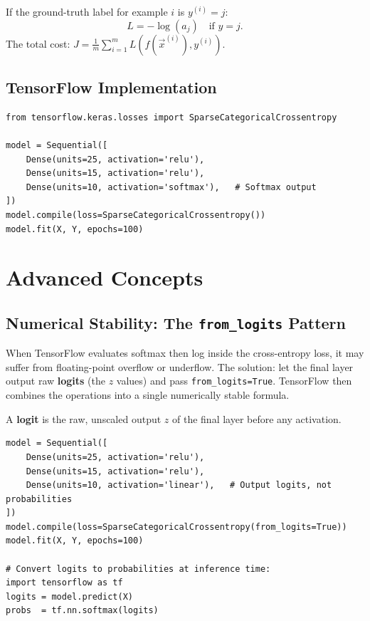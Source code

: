 If the ground-truth label for example $i$ is $y^{(i)}=j$:
\begin{equation}
L=-\log(a_j)\quad\text{if }y=j.
\end{equation}
The total cost: $J=\frac{1}{m}\sum_{i=1}^m L(f(\vec{x}^{(i)}),y^{(i)})$.

\subsection{TensorFlow Implementation}

\begin{lstlisting}[caption={Softmax network for 10-class digit recognition}]
from tensorflow.keras.losses import SparseCategoricalCrossentropy

model = Sequential([
    Dense(units=25, activation='relu'),
    Dense(units=15, activation='relu'),
    Dense(units=10, activation='softmax'),   # Softmax output
])
model.compile(loss=SparseCategoricalCrossentropy())
model.fit(X, Y, epochs=100)
\end{lstlisting}

\section{Advanced Concepts}

\subsection{Numerical Stability: The \texttt{from\_logits} Pattern}

When TensorFlow evaluates softmax then log inside the cross-entropy loss, it
may suffer from floating-point overflow or underflow. The solution: let the
final layer output raw \textbf{logits} (the $z$ values) and pass
\lstinline{from_logits=True}. TensorFlow then combines the operations into a
single numerically stable formula.

\begin{definition}[Logit]
A \textbf{logit} is the raw, unscaled output $z$ of the final layer before any
activation.
\end{definition}

\begin{lstlisting}[caption={Numerically stable multiclass model (recommended in production)}]
model = Sequential([
    Dense(units=25, activation='relu'),
    Dense(units=15, activation='relu'),
    Dense(units=10, activation='linear'),   # Output logits, not probabilities
])
model.compile(loss=SparseCategoricalCrossentropy(from_logits=True))
model.fit(X, Y, epochs=100)

# Convert logits to probabilities at inference time:
import tensorflow as tf
logits = model.predict(X)
probs  = tf.nn.softmax(logits)
\end{lstlisting}

